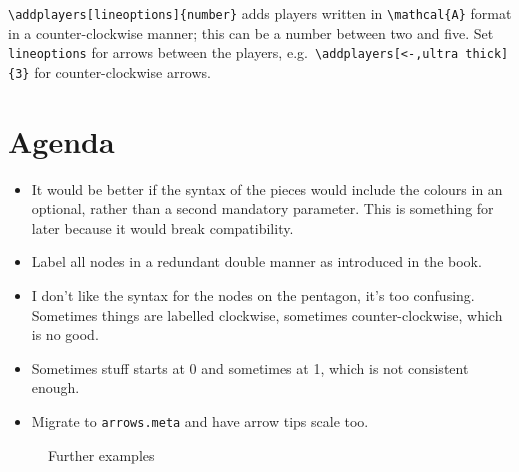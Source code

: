\documentclass[a5paper]{scrartcl}
\begin{document}
\verb|\addplayers[lineoptions]{number}| adds players written in \verb|\mathcal{A}| format in a counter-clockwise manner; this can be a number between two and five. Set \verb|lineoptions| for arrows between the players, e.g.~\verb|\addplayers[<-,ultra thick]{3}| for counter-clockwise arrows.



\section*{Agenda}
\begin{itemize}
    \item It would be better if the syntax of the pieces would include the colours in an optional, rather than a second mandatory parameter. This is something for later because it would break compatibility.
    \item Label all nodes in a redundant double manner as introduced in the book.
    \item I don't like the syntax for the nodes on the pentagon, it's too confusing. Sometimes things are labelled clockwise, sometimes counter-clockwise, which is no good. 
    \item Sometimes stuff starts at 0 and sometimes at 1, which is not consistent enough.
    \item Migrate to \verb|arrows.meta| and have arrow tips scale too.
\end{itemize}

\begin{figure}
    \centering
    
    \caption{Further examples}
    \label{fig:furtherexamples}
\end{figure}
\end{document}

